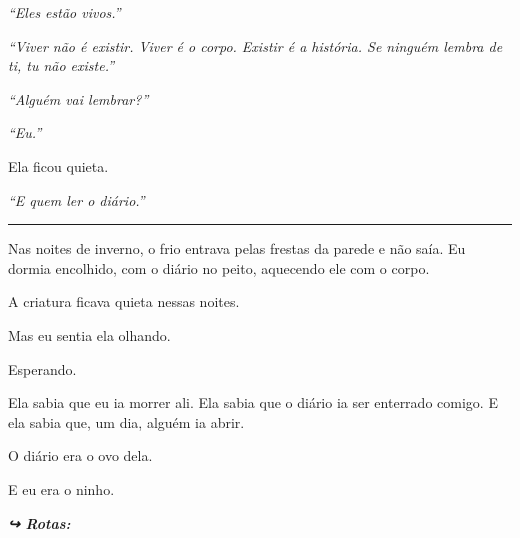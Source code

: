 \noindent \textit{\textquotedblleft{}Eles estão vivos.\textquotedblright{}}

\noindent \textit{\textquotedblleft{}Viver não é existir. Viver é o corpo. Existir é a história. Se ninguém lembra de ti, tu não existe.\textquotedblright{}}

\noindent \textit{\textquotedblleft{}Alguém vai lembrar?\textquotedblright{}}

\noindent \textit{\textquotedblleft{}Eu.\textquotedblright{}}

\noindent Ela ficou quieta.

\noindent \textit{\textquotedblleft{}E quem ler o diário.\textquotedblright{}}

\vspace{0.5em}\noindent\rule{\textwidth}{0.5pt}\vspace{0.5em}

\noindent Nas noites de inverno, o frio entrava pelas frestas da parede e não saía. Eu dormia encolhido, com o diário no peito, aquecendo ele com o corpo.

\noindent A criatura ficava quieta nessas noites.

\noindent Mas eu sentia ela olhando.

\noindent Esperando.

\noindent Ela sabia que eu ia morrer ali. Ela sabia que o diário ia ser enterrado comigo. E ela sabia que, um dia, alguém ia abrir.

\noindent O diário era o ovo dela.

\noindent E eu era o ninho.

\vspace{0.5em}
\noindent\textit{\textbf{↪ Rotas:}  \rotasep {}}